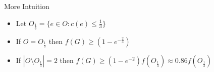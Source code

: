 \begin{frame}{More Intuition}
    \begin{itemize}[<+->]
        \item Let $O_{\frac{1}{3}} = \{e \in O : c(e) \leq \frac{1}{3}\}$    
        \item If $O = O_{\frac{1}{3}}$ then $f(G) \geq (1 - e^{-\frac{2}{3}})$
        \item If $|O \setminus O_{\frac{1}{3}}| = 2$ then $f(G) \geq (1 - e^{-2})f(O_{\frac{1}{3}}) \approx 0.86f(O_{\frac{1}{3}})$
    \end{itemize}
\end{frame}